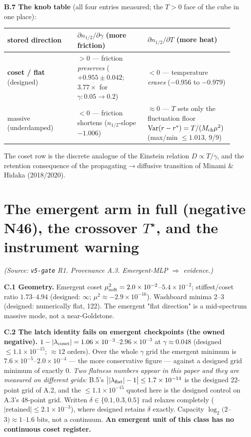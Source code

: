 \documentclass{article}
\begin{document}
\textbf{B.7 The knob table} (all four entries measured; the $T>0$ face of the cube in one place):

\begin{table}[t]\centering\small
\begin{tabular}{p{0.307\linewidth}p{0.307\linewidth}p{0.307\linewidth}}
\toprule
stored direction & $\partial n_{1/2}/\partial\gamma$ (more friction) & $\partial n_{1/2}/\partial T$ (more heat) \\
\midrule
\textbf{coset / flat} (designed) & \textbf{$>0$} --- friction \emph{preserves} ($+0.955\pm0.042$; $3.77\times$ for $\gamma:0.05\to0.2$) & \textbf{$<0$} --- temperature \emph{erases} ($-0.956$ to $-0.979$) \\
massive (underdamped) & $<0$ --- friction shortens ($n_{1/2}$-slope $-1.006$) & $\approx0$ --- $T$ sets only the fluctuation floor $\mathrm{Var}(r-r^*)=T/(M_{\rm ch}\mu^2)$ (max/min $\le1.013$, 9/9) \\
\bottomrule
\end{tabular}
\end{table}

The coset row is the discrete analogue of the Einstein relation $D\propto T/\gamma$, and the retention consequence of the propagating$\to$diffusive transition of Minami \& Hidaka (2018/2020).

\section{The emergent arm in full (negative N46), the crossover $T^\star$, and the instrument warning}

\emph{(Source: \texttt{v5-gate} R1. Provenance A.3. Emergent-MLP $\Rightarrow$ evidence.)}

\textbf{C.1 Geometry.} Emergent coset $\mu^2_{\rm soft}=2.0\times10^{-2}$--$5.4\times10^{-2}$; stiffest/coset ratio $1.73$--$4.94$ (designed: $\infty$; $\mu^2\approx-2.9\times10^{-16}$). Washboard minima 2--3 (designed: numerically flat, 122). The emergent "flat direction" is a mid-spectrum massive mode, not a near-Goldstone.

\textbf{C.2 The latch identity fails on emergent checkpoints (the owned negative).} $1-|\lambda_{\rm coset}|=1.06\times10^{-3}$--$2.96\times10^{-3}$ at $\gamma\approx0.048$ (designed $\le1.1\times10^{-15}$; $\approx12$ orders). Over the whole $\gamma$ grid the emergent minimum is $7.6\times10^{-5}$--$2.0\times10^{-4}$ --- the more conservative figure --- against a designed grid minimum of exactly $0$. \emph{Two flatness numbers appear in this paper and they are measured on different grids:} B.5's $\big||\lambda_{\rm flat}|-1\big|\le1.7\times10^{-14}$ is the designed 22-point grid of A.2, and the $\le1.1\times10^{-15}$ quoted here is the designed control on A.3's 48-point grid. Written $\delta\in\{0.1,0.3,0.5\}$ rad relaxes completely ($|\text{retained}|\le2.1\times10^{-3}$), where designed retains $\delta$ exactly. Capacity $\log_2(2$--$3)\approx1$--$1.6$ bits, not a continuum. \textbf{An emergent unit of this class has no continuous coset register.}
\end{document}
